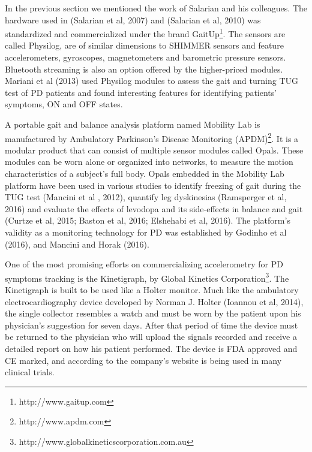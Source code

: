 In the previous section we mentioned the work of Salarian and his colleagues. The hardware used in (Salarian et al, 2007) and (Salarian et al, 2010) was standardized and commercialized under the brand GaitUp\footnote{http://www.gaitup.com}. The sensors are called Physilog, are of similar dimensions to \gls{SHIMMER} sensors and feature accelerometers, gyroscopes, magnetometers and barometric pressure sensors. Bluetooth streaming is also an option offered by the higher-priced modules. Mariani et al (2013) used Physilog modules to assess the gait and turning \gls{TUG} test of \gls{PD} patients and found interesting features for identifying patients' symptoms, ON and OFF states. 

A portable gait and balance analysis platform named Mobility Lab is manufactured by Ambulatory Parkinson's Disease Monitoring (\gls{APDM})\footnote{http://www.apdm.com}. It is a modular product that can consist of multiple sensor modules called Opals. These modules can be worn alone or organized into networks, to measure the motion characteristics of a subject's full body. Opals embedded in the Mobility Lab platform have been used in various studies to identify freezing of gait during the \gls{TUG} test (Mancini et al , 2012), quantify leg dyskinesias (Ramsperger et al, 2016) and evaluate the effects of levodopa and its side-effects in balance and gait (Curtze et al, 2015; Baston et al, 2016; Elshehabi et al, 2016). The platform's validity as a monitoring technology for \gls{PD} was established by Godinho et al (2016), and Mancini and Horak (2016). 

One of the most promising efforts on commercializing accelerometry for \gls{PD} symptoms tracking is the Kinetigraph, by Global Kinetics Corporation\footnote{http://www.globalkineticscorporation.com.au}. The Kinetigraph is built to be used like a Holter monitor. Much like the ambulatory electrocardiography device  developed by Norman J. Holter (Ioannou et al, 2014), the single collector resembles a watch and must be worn by the patient upon his physician's suggestion for seven days. After that period of time the device must be returned to the physician who will upload the signals recorded and receive a detailed report on how his patient performed. The device is \gls{FDA} approved and \gls{CE} marked, and according to the company's website  is being used in many clinical trials. 

